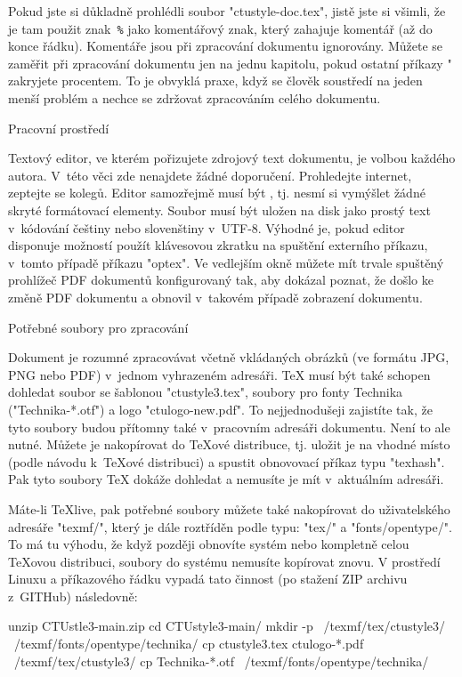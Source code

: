 Pokud jste si důkladně prohlédli soubor "ctustyle-doc.tex", jistě jste si všimli, že
je tam použit znak~{\tt\%} jako komentářový znak, který zahajuje komentář
(až do konce řádku). Komentáře jsou při zpracování dokumentu ignorovány. 
Můžete se zaměřit při zpracování dokumentu jen na jednu kapitolu, pokud ostatní
příkazy " zakryjete procentem. To je obvyklá praxe, když se
člověk soustředí na jeden menší problém a nechce se zdržovat zpracováním
celého dokumentu.


\sec Pracovní prostředí

Textový editor, ve kterém pořizujete zdrojový text dokumentu, je volbou
každého autora. V~této věci zde nenajdete žádné doporučení. Prohledejte
internet, zeptejte se kolegů. Editor samozřejmě musí být , tj. nesmí si vymýšlet žádné skryté formátovací elementy. Soubor
musí být uložen na disk jako prostý text v~kódování češtiny nebo slovenštiny 
v~UTF-8. Výhodné je, pokud editor disponuje možností použít klávesovou zkratku
na spuštění externího příkazu, v~tomto případě příkazu 
"optex". Ve vedlejším okně můžete mít trvale spuštěný prohlížeč PDF
dokumentů konfigurovaný tak, aby dokázal poznat, že došlo ke
změně PDF dokumentu a obnovil v~takovém případě zobrazení dokumentu.

\sec Potřebné soubory pro zpracování

Dokument je rozumné zpracovávat včetně vkládaných obrázků (ve formátu JPG,
PNG nebo PDF) v~jednom vyhrazeném adresáři. \TeX{} musí být také schopen
dohledat soubor se šablonou "ctustyle3.tex", soubory pro fonty Technika 
("Technika-*.otf") a logo
"ctulogo-new.pdf". To nejjednodušeji zajistíte tak, že tyto soubory budou
přítomny také v~pracovním adresáři dokumentu. 
Není to ale nutné. Můžete je nakopírovat do \TeX{}ové distribuce, tj. uložit
je na vhodné místo (podle návodu k~\TeX{}ové distribuci) a spustit
obnovovací příkaz typu "texhash". Pak tyto soubory \TeX{} dokáže dohledat a
nemusíte je mít v~aktuálním adresáři. 

Máte-li \TeX{}live, pak potřebné soubory můžete také nakopírovat do
uživatelského adresáře "texmf/", který je dále roztříděn podle typu: 
"tex/" a "fonts/opentype/". 
To má tu výhodu, že když později obnovíte systém nebo
kompletně celou \TeX{}ovou distribuci, soubory do
systému nemusíte kopírovat znovu. V prostředí Linuxu a příkazového řádku
vypadá tato činnost (po stažení ZIP archivu
z~GITHub) následovně:

\begtt
unzip CTUstle3-main.zip
cd CTUstyle3-main/
mkdir -p ~/texmf/tex/ctustyle3/ ~/texmf/fonts/opentype/technika/
cp ctustyle3.tex ctulogo-*.pdf ~/texmf/tex/ctustyle3/
cp Technika-*.otf ~/texmf/fonts/opentype/technika/
\endtt

